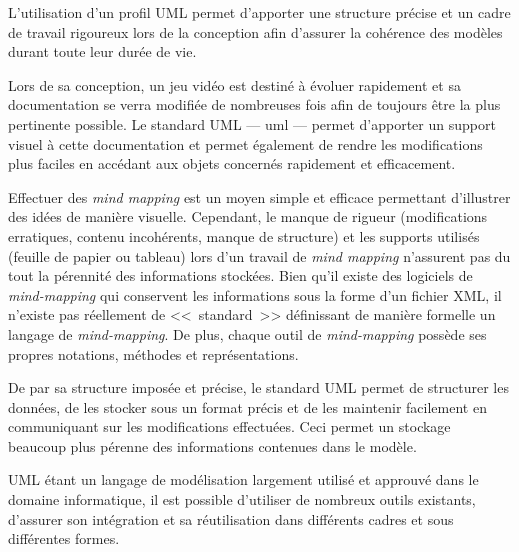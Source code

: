 L'utilisation d'un profil UML permet d'apporter une structure précise et un cadre de travail rigoureux lors de la conception afin d'assurer la cohérence des modèles durant toute leur durée de vie.

Lors de sa conception, un jeu vidéo est destiné à évoluer rapidement et sa documentation se verra modifiée de nombreuses fois afin de toujours être la plus pertinente possible.
Le standard UML --- \gls{uml} --- permet d'apporter un support visuel à cette documentation et permet également de rendre les modifications plus faciles en accédant aux objets concernés rapidement et efficacement. 

Effectuer des \emph{mind mapping} est un moyen simple et efficace permettant d'illustrer des idées de manière visuelle.
Cependant, le manque de rigueur (modifications erratiques, contenu incohérents, manque de structure) et les supports utilisés (feuille de papier ou tableau) lors d'un travail de \emph{mind mapping} n'assurent pas du tout la pérennité des informations stockées.
Bien qu'il existe des logiciels de \emph{mind-mapping} qui conservent les informations sous la forme d'un fichier XML, il n'existe pas réellement de <<~standard~>> définissant de manière formelle un langage de \emph{mind-mapping}.
De plus, chaque outil de \emph{mind-mapping} possède ses propres notations, méthodes et représentations.

De par sa structure imposée et précise, le standard UML permet de structurer les données, de les stocker sous un format précis et de les maintenir facilement en communiquant sur les modifications effectuées.
Ceci permet un stockage beaucoup plus pérenne des informations contenues dans le modèle.



UML étant un langage de modélisation largement utilisé et approuvé dans le domaine informatique, il est possible d'utiliser de nombreux outils existants, d'assurer son intégration et sa réutilisation dans différents cadres et sous différentes formes.

